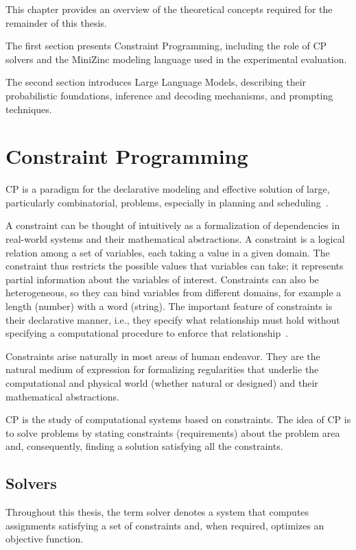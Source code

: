 \documentclass[../../main]{subfiles}
\begin{document}
This chapter provides an overview of the theoretical concepts required for the remainder of this thesis.

The first section presents Constraint Programming, including the role of CP solvers and the MiniZinc modeling language used in the experimental evaluation.

The second section introduces Large Language Models, describing their probabilistic foundations, inference and decoding mechanisms, and prompting techniques.

\section{Constraint Programming}
CP is a paradigm for the declarative modeling and effective solution of large, particularly combinatorial, problems, especially in planning and scheduling~\cite{CPholygrail}.

A constraint can be thought of intuitively as a formalization of dependencies in real-world systems and their mathematical abstractions. A constraint is a logical relation among a set of variables, each taking a value in a given domain. The constraint thus restricts the possible values that variables can take; it represents partial information about the variables of interest. Constraints can also be heterogeneous, so they can bind variables from different domains, for example a length (number) with a word (string). The important feature of constraints is their declarative manner, i.e., they specify what relationship must hold without specifying a computational procedure to enforce that relationship~\cite{CPholygrail}.

Constraints arise naturally in most areas of human endeavor. They are the natural medium of expression for formalizing regularities that underlie the computational and physical world (whether natural or designed) and their mathematical abstractions. 

CP is the study of computational systems based on constraints. The idea of CP is to solve problems by stating constraints (requirements) about the problem area and, consequently, finding a solution satisfying all the constraints.

\subsection{Solvers}

Throughout this thesis, the term solver denotes a system that computes assignments satisfying a set of constraints and, when required, optimizes an objective function.
\end{document}
